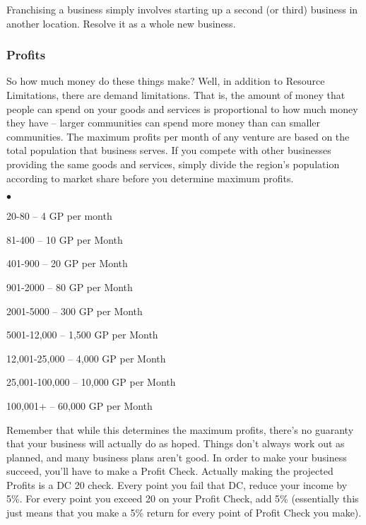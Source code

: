Franchising a business simply involves starting up a second (or third) business in another location. Resolve it as a whole new business.

\subsubsection{Profits}

So how much money do these things make? Well, in addition to Resource Limitations, there are demand limitations. That is, the amount of money that people can spend on your goods and services is proportional to how much money they have -- larger communities can spend more money than can smaller communities. The maximum profits per month of any venture are based on the total population that business serves. If you compete with other businesses providing the same goods and services, simply divide the region's population according to market share before you determine maximum profits.

\begin{list}{$\bullet$}{\itemspace}
    \item 20-80 -- 4 GP per month
    \item 81-400 -- 10 GP per Month
    \item 401-900 -- 20 GP per Month
    \item 901-2000 -- 80 GP per Month
    \item 2001-5000 -- 300 GP per Month
    \item 5001-12,000 -- 1,500 GP per Month
    \item 12,001-25,000 -- 4,000 GP per Month
    \item 25,001-100,000 -- 10,000 GP per Month
    \item 100,001+ -- 60,000 GP per Month
\end{list}

\vspace*{8pt}

Remember that while this determines the maximum profits, there's no guaranty that your business will actually do as hoped. Things don't always work out as planned, and many business plans aren't good. In order to make your business succeed, you'll have to make a Profit Check. Actually making the projected Profits is a DC 20 check. Every point you fail that DC, reduce your income by 5\%. For every point you exceed 20 on your Profit Check, add 5\% (essentially this just means that you make a 5\% return for every point of Profit Check you make).

